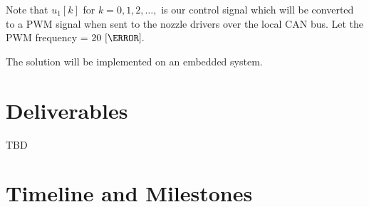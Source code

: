 





Note that $u_1[k]$ for $k=0,1,2,\ldots,$ is our control signal which will be converted to a PWM signal when sent to the nozzle drivers over the local CAN bus. Let the PWM frequency = $20~[\hertz].$



The solution will be implemented on an embedded system.

\section{Deliverables}
\label{sec:deliverables}

TBD

\section{Timeline and Milestones}
\label{sec:timeline}



